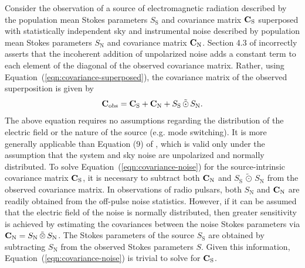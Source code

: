 \documentclass[twocolumn]{aastex6}
\newcommand{\Eqn}[1]{Equation~(\ref{eqn:#1})}
\newcommand{\stimes}{\ensuremath{\tilde{\otimes}}}
\newcommand{\spinorBilinear}[2]{\ensuremath{{#1}\,\stimes\,{#2}}}
\newcommand{\outerSymm}[2]{\ensuremath{{#1}\,\tilde{\odot}\,{#2}}}
\begin{document}

Consider the observation of a source of electromagnetic radiation
described by the population mean Stokes parameters $S_\mathrm{S}$ and
covariance matrix ${\bf C}_\mathrm{S}$ superposed with statistically
independent sky and instrumental noise described by population mean
Stokes parameters $S_\mathrm{N}$ and covariance matrix ${\bf
  C}_\mathrm{N}$.
%
Section 4.3 of \cite{van09} incorrectly asserts that the incoherent
addition of unpolarized noise adds a constant term to each element of
the diagonal of the observed covariance matrix.
%
Rather, using \Eqn{covariance-superposed}, the
covariance matrix of the observed superposition is given by
%
\begin{equation}
{\bf C}_{\rm obs} = {\bf C}_\mathrm{S} + {\bf C}_\mathrm{N} + \outerSymm{S_\mathrm{S}}{S_\mathrm{N}}.
\label{eqn:covariance-noise}
\end{equation}
%
The above equation requires no assumptions regarding the distribution of
the electric field or the nature of the source (e.g. mode switching).
%
It is more generally applicable than Equation (9) of \citet{ch77},
which is valid only under the assumption that the system and sky noise
are unpolarized and normally distributed.
%
%
To solve \Eqn{covariance-noise} for the source-intrinsic covariance
matrix ${\bf C}_\mathrm{S}$, it is necessary to subtract both ${\bf
  C}_\mathrm{N}$ and $\outerSymm{S_\mathrm{S}}{S_\mathrm{N}}$ from the
observed covariance matrix.
%
In observations of radio pulsars, both $S_\mathrm{N}$ and ${\bf
  C}_\mathrm{N}$ are readily obtained from the off-pulse noise
statistics.
%
However, if it can be assumed that the electric field of the noise is
normally distributed, then greater sensitivity is achieved by
estimating the covariances between the noise Stokes parameters via
${\bf C}_\mathrm{N} = \spinorBilinear{S_\mathrm{N}}{S_\mathrm{N}}$.
%
The Stokes parameters of the source $S_\mathrm{S}$ are obtained by
subtracting $S_\mathrm{N}$ from the observed Stokes parameters $S$.
%
Given this information, \Eqn{covariance-noise} is trivial to solve for
${\bf C}_\mathrm{S}$.


\end{document}
